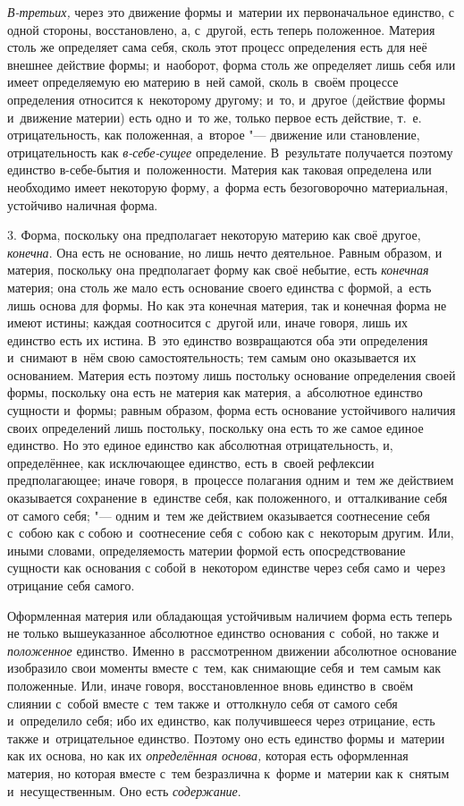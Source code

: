 {\em В-третьих,} через это движение формы и~материи их первоначальное единство,
с одной стороны, восстановлено, а, с~другой, есть теперь положенное. Материя
столь же определяет сама себя, сколь этот процесс определения есть для неё
внешнее действие формы; и~наоборот, форма столь же определяет лишь себя или
имеет определяемую ею материю в~ней самой, сколь в~своём процессе определения
относится к~некоторому другому; и~то, и~другое (действие формы и~движение
материи) есть одно и~то же, только первое есть действие, т.~е. отрицательность,
как положенная, а~второе "--- движение или становление, отрицательность как
{\em в-себе-сущее} определение. В~результате получается поэтому единство
в-себе-бытия и~положенности. Материя как таковая определена или необходимо
имеет некоторую форму, а~форма есть безоговорочно материальная, устойчиво
наличная форма.

3. Форма, поскольку она предполагает некоторую материю как своё другое,
{\em конечна}. Она есть не основание, но лишь нечто деятельное. Равным образом,
и материя, поскольку она предполагает форму как своё небытие, есть
{\em конечная} материя; она столь же мало есть основание своего единства с
формой, а~есть лишь основа для формы. Но как эта конечная материя, так и
конечная форма не имеют истины; каждая соотносится с~другой или, иначе говоря,
лишь их единство есть их истина. В~это единство возвращаются оба эти
определения и~снимают в~нём свою самостоятельность; тем самым оно оказывается
их основанием. Материя есть поэтому лишь постольку основание определения своей
формы, поскольку она есть не материя как материя, а~абсолютное единство
сущности и~формы; равным образом, форма есть основание устойчивого наличия
своих определений лишь постольку, поскольку она есть то же самое единое
единство. Но это единое единство как абсолютная отрицательность, и,
определённее, как исключающее единство, есть в~своей рефлексии предполагающее;
иначе говоря, в~процессе полагания одним и~тем же действием оказывается
сохранение в~единстве себя, как положенного, и~отталкивание себя от самого
себя; "--- одним и~тем же действием оказывается соотнесение себя с~собою как с
собою и~соотнесение себя с~собою как с~некоторым другим. Или, иными словами,
определяемость материи формой есть опосредствование сущности как основания с
собой в~некотором единстве через себя само и~через отрицание себя самого.

Оформленная материя или обладающая устойчивым наличием форма есть теперь не
только вышеуказанное абсолютное единство основания с~собой, но также и
{\em положенное} единство. Именно в~рассмотренном движении абсолютное основание
изобразило свои моменты вместе с~тем, как снимающие себя и~тем самым как
положенные. Или, иначе говоря, восстановленное вновь единство в~своём слиянии
с~собой вместе с~тем также и~оттолкнуло себя от самого себя и~определило себя;
ибо их единство, как получившееся через отрицание, есть также и~отрицательное
единство. Поэтому оно есть единство формы и~материи как их основа, но как их
{\em определённая основа,} которая есть оформленная материя, но которая вместе
с~тем безразлична к~форме и~материи как к~снятым и~несущественным. Оно есть
{\em содержание}.

